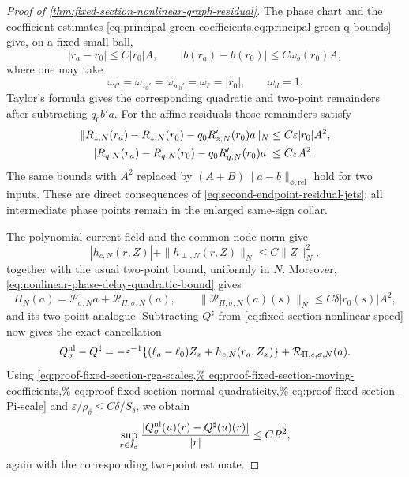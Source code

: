 \begin{proof}[Proof of
\cref{thm:fixed-section-nonlinear-graph-residual}]
The phase chart and the coefficient estimates
\cref{eq:principal-green-coefficients,eq:principal-green-q-bounds}
give, on a fixed small ball,
\begin{equation}
 |r_a-r_0|\le C|r_0|A,\qquad
 |b(r_a)-b(r_0)|\le C\omega_b(r_0)A,              \label{eq:proof-fixed-section-moving-coefficients}
\end{equation}
where one may take
\[
 \omega_{\mathcal C}=\omega_{z_0'}=\omega_{w_0'}
   =\omega_\ell=|r_0|,\qquad \omega_d=1.
\]
Taylor's formula gives the corresponding quadratic and two-point
remainders after subtracting \(q_0b'a\).  For the affine residuals those
remainders satisfy
\begin{align}
 \|R_{z,N}(r_a)-R_{z,N}(r_0)
          -q_0R_{z,N}'(r_0)a\|_N
 &\le C\varepsilon|r_0|A^2,\notag\\
 |R_{q,N}(r_a)-R_{q,N}(r_0)
          -q_0R_{q,N}'(r_0)a|
 &\le C\varepsilon A^2.                          \label{eq:proof-fixed-section-affine-remainders}
\end{align}
The same bounds with \(A^2\) replaced by
\((A+B)\|a-b\|_{\phi,\mathrm{rel}}\) hold for two inputs.  These are
direct consequences of
\cref{eq:second-endpoint-residual-jets}; all intermediate phase points
remain in the enlarged same-sign collar.

The polynomial current field and the common node norm give
\begin{equation}
 |h_{c,N}(r,Z)|+\|h_{\perp,N}(r,Z)\|_N
 \le C\|Z\|_N^2,                                 \label{eq:proof-fixed-section-normal-quadraticity}
\end{equation}
together with the usual two-point bound, uniformly in \(N\).  Moreover,
\cref{eq:nonlinear-phase-delay-quadratic-bound} gives
\begin{equation}
 \Pi_N(a)=\mathscr P_{\sigma,N}a+\mathcal R_{\Pi,\sigma,N}(a),\qquad
 \|\mathcal R_{\Pi,\sigma,N}(a)(s)\|_N
       \le C\delta|r_0(s)|A^2,                   \label{eq:proof-fixed-section-Pi-scale}
\end{equation}
and its two-point analogue.  Subtracting \(Q^\sharp\) from
\cref{eq:fixed-section-nonlinear-speed} now gives the exact cancellation
\begin{equation}
 Q_\sigma^{\rm nl}-Q^\sharp
 =-\varepsilon^{-1}\{(\ell_a-\ell_0)Z_x
                  +h_{c,N}(r_a,Z_x)\}
       +\mathcal R_{\Pi,c,\sigma,N}(a).           \label{eq:proof-fixed-section-speed-remainder}
\end{equation}
Using
\cref{eq:proof-fixed-section-rga-scales,%
eq:proof-fixed-section-moving-coefficients,%
eq:proof-fixed-section-normal-quadraticity,%
eq:proof-fixed-section-Pi-scale}
and
\(\varepsilon/\rho_\delta\le C\delta/S_\delta\), we obtain
\begin{equation}
 \sup_{r\in I_\sigma}
   \frac{|Q_\sigma^{\rm nl}(u)(r)-Q^\sharp(u)(r)|}{|r|}
 \le CR^2,                                       \label{eq:proof-fixed-section-speed-quadratic-bound}
\end{equation}
again with the corresponding two-point estimate.


\end{proof}

